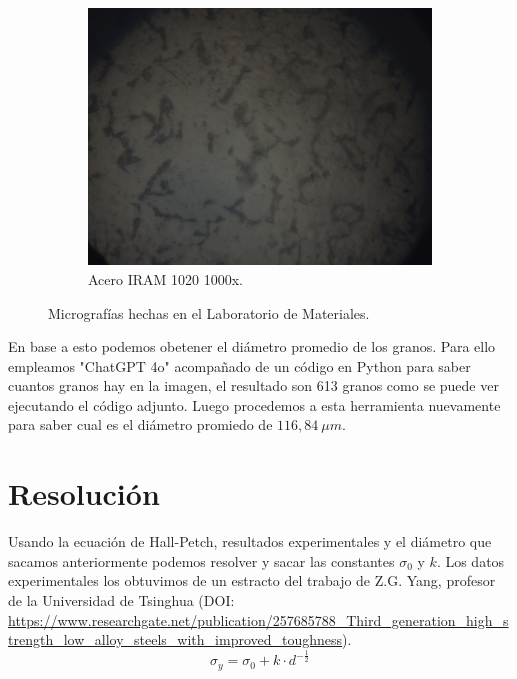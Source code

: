 \documentclass[12pt,a4paper]{article}
\begin{document}
\begin{figure}[h]
    \vspace{1em}

    \begin{subfigure}[b]{0.6\linewidth}
        \centering
        \includegraphics[width=\linewidth]{Figuras/Del-Rio_8.png}
        \caption{Acero IRAM 1020 1000x.}
        \label{1000x}
    \end{subfigure}
    \caption{Micrografías hechas en el Laboratorio de Materiales.}
\end{figure}
En base a esto podemos obetener el diámetro promedio de los granos. Para ello empleamos "ChatGPT 4o" acompañado de un código en Python para saber cuantos granos hay en la imagen, el resultado son 613 granos como se puede ver ejecutando el código adjunto. Luego procedemos a esta herramienta nuevamente para saber cual es el diámetro promiedo de $116,84\: \mu m$.

\section{Resolución}
Usando la ecuación de Hall-Petch, resultados experimentales y el diámetro que sacamos anteriormente podemos resolver y sacar las constantes $\sigma_0$ y $k$. Los datos experimentales los obtuvimos de un estracto del trabajo de Z.G. Yang, profesor de la Universidad de Tsinghua (DOI: \url{https://www.researchgate.net/publication/257685788_Third_generation_high_strength_low_alloy_steels_with_improved_toughness}).
\begin{equation}
    \sigma_y = \sigma_0 +k\cdot d^{-\frac{1}{2}}
\end{equation}
\end{document}

